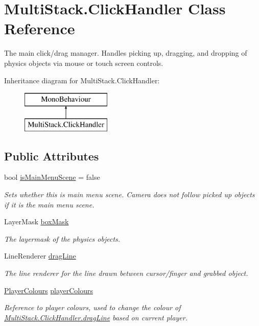 \hypertarget{class_multi_stack_1_1_click_handler}{}\section{Multi\+Stack.\+Click\+Handler Class Reference}
\label{class_multi_stack_1_1_click_handler}


The main click/drag manager. Handles picking up, dragging, and dropping of physics objects via mouse or touch screen controls.  


Inheritance diagram for Multi\+Stack.\+Click\+Handler\+:\begin{figure}[H]
\begin{center}
\leavevmode
\includegraphics[height=2.000000cm]{class_multi_stack_1_1_click_handler}
\end{center}
\end{figure}
\subsection*{Public Attributes}
\begin{DoxyCompactItemize}
\item 
bool \hyperlink{class_multi_stack_1_1_click_handler_a2e0855046aafb6f87b298c83de1c82f5}{is\+Main\+Menu\+Scene} = false
\begin{DoxyCompactList}\small\item\em Sets whether this is main menu scene. Camera does not follow picked up objects if it is the main menu scene. \end{DoxyCompactList}\item 
Layer\+Mask \hyperlink{class_multi_stack_1_1_click_handler_a89cab89c49c38f4b96855de249618405}{box\+Mask}
\begin{DoxyCompactList}\small\item\em The layermask of the physics objects. \end{DoxyCompactList}\item 
Line\+Renderer \hyperlink{class_multi_stack_1_1_click_handler_a7d28187d20185f4b352669cbd072b3b5}{drag\+Line}
\begin{DoxyCompactList}\small\item\em The line renderer for the line drawn between cursor/finger and grabbed object. \end{DoxyCompactList}\item 
\hyperlink{class_multi_stack_1_1_player_colours}{Player\+Colours} \hyperlink{class_multi_stack_1_1_click_handler_a02d956303c6e5a958379602f9103add7}{player\+Colours}
\begin{DoxyCompactList}\small\item\em Reference to player colours, used to change the colour of \hyperlink{class_multi_stack_1_1_click_handler_a7d28187d20185f4b352669cbd072b3b5}{Multi\+Stack.\+Click\+Handler.\+drag\+Line} based on current player. \end{DoxyCompactList}\end{DoxyCompactItemize}
